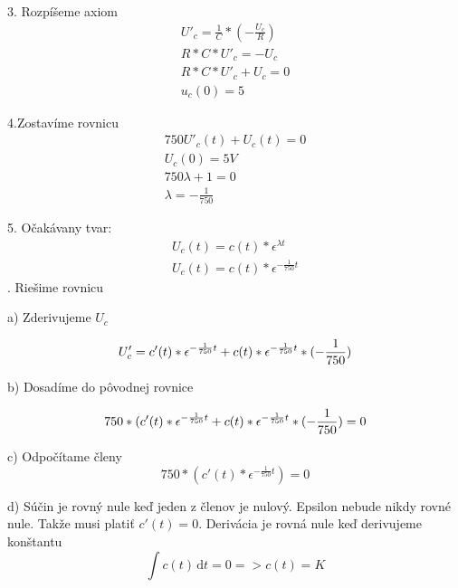 \documentclass[a4paper,12pt]{article}
\begin{document}
3. Rozpíšeme axiom
 \begin {equation*}
    \begin{split}
	U'_c=\frac{1}{C}*(-\frac{U_c}{R}) \\
	R * C * U'_c = -U_c \\
	R * C * U'_c +  U_c = 0 \\
	u_c(0) = 5
    \end{split}
\end{equation*}

4.Zostavíme rovnicu
 \begin {equation*}
    \begin{split}
	750U'_c(t) + U_c(t) = 0 \\
	U_c(0) = 5 V \\
	750\lambda + 1 = 0 \\
	\lambda = -\frac{1}{750}
    \end{split}
\end{equation*}

5. Očakávany tvar:
 \begin {equation*}
    \begin{split}
	U_c(t) = c(t) * \epsilon^{\lambda t} \\
	U_c(t) = c(t) * \epsilon^{-\frac{1}{750}t}
    \end{split}
\end{equation*}
. Riešime rovnicu

a) Zderivujeme $U_c$

\begin {equation*}
	U'_c = c'(t) * \epsilon^{-\frac{1}{750}t} +c(t)  * \epsilon^{-\frac{1}{750}t} *(-\frac{1}{750}) \\
\end{equation*}

b) Dosadíme do pôvodnej rovnice

\begin{equation*}
	750 * (c'(t) * \epsilon^{-\frac{1}{750}t} + c(t) * \epsilon^{-\frac{1}{750}t} *(-\frac{1}{750}) = 0\\
\end{equation*}

c) Odpočítame členy
\begin{equation*}
	750 * (c'(t) * \epsilon^{-\frac{1}{750}t}) = 0
\end{equation*}

d) Súčin je rovný nule keď jeden z členov je nulový. Epsilon nebude nikdy rovné nule. Takže musi platiť $c'(t) = 0$. Derivácia je rovná nule keď derivujeme konštantu
\begin{equation*}
	\int c(t)\, \mathrm{d}t = 0 => c(t) = K
\end{equation*}
\end{document}
